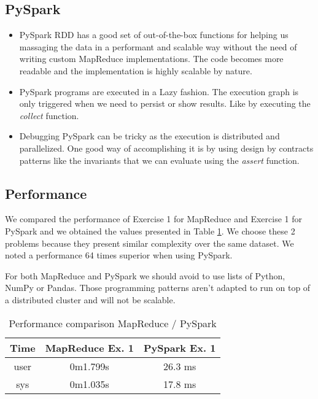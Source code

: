 \documentclass[conference,compsoc]{IEEEtran}
\begin{document}
\subsection{PySpark}
\begin{itemize}
\item PySpark RDD has a good set of out-of-the-box functions for helping us massaging the data in a performant and scalable way without the need of writing custom MapReduce implementations. The code becomes more readable and the implementation is highly scalable by nature.
\item PySpark programs are executed in a Lazy fashion. The execution graph is only triggered when we need to persist or show results. Like by executing the \textit{collect} function.
\item Debugging PySpark can be tricky as the execution is distributed and parallelized. One good way of accomplishing it is by using design by contracts patterns like the invariants that we can evaluate using the \textit{assert} function.
\end{itemize}

\subsection{Performance}
We compared the performance of Exercise 1 for MapReduce and Exercise 1 for PySpark and we obtained the values presented in Table \ref{perf_conclusion}. We choose these 2 problems because they present similar complexity over the same dataset. We noted a performance 64 times superior when using PySpark. \par
For both MapReduce and PySpark we should avoid to use lists of Python, NumPy or Pandas. Those programming patterns aren't adapted to run on top of a distributed cluster and will not be scalable.

\begin{table}[!t]
\renewcommand{\arraystretch}{1.3}
\caption{Performance comparison MapReduce / PySpark}
\label{perf_conclusion}
\centering
\begin{tabular}{c||c|c}
\hline
\bfseries Time & \bfseries MapReduce Ex. 1 & \bfseries PySpark Ex. 1 \\
\hline\hline
 user & 0m1.799s           & 26.3 ms \\
 sys  & 0m1.035s           & 17.8 ms \\
\hline
\end{tabular}
\end{table}
\end{document}

